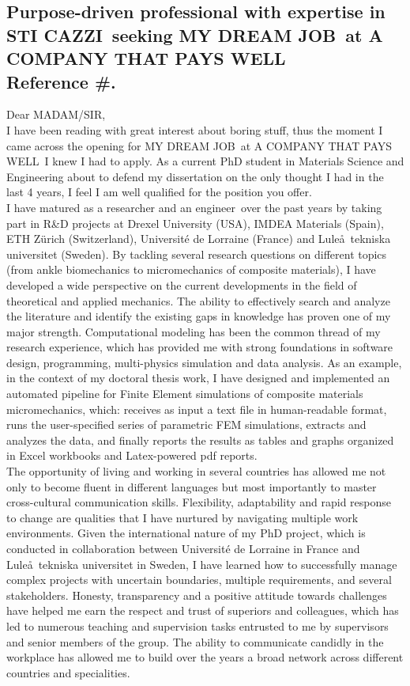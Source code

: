 \documentclass[
  a4paper, 
]{fortysecondscv}
\def\expertise{STI CAZZI}
\def\position{MY DREAM JOB}
\def\company{A COMPANY THAT PAYS WELL}
\def\reference{\\[6pt] Reference \#}
\def\salutation{MADAM/SIR}
\def\readinginterest{boring stuff}
\def\dissertationtopic{the only thought I had in the last 4 years}
\def\profession{a researcher and an engineer}
\def\fieldofexpertise{theoretical and applied mechanics}
\begin{document}
\makefrontsidebar

\cvsignature
\vspace*{12pt}
\subsection{\textbf{Purpose-driven professional with expertise in \expertise\ seeking \position\ at \company\reference.}}
\vspace*{12pt}
Dear \salutation,\\[6pt]
I have been reading with great interest about \readinginterest, thus the moment I came across the opening for \position\ at \company\ I knew I had to apply. As a current PhD student in Materials Science and Engineering about to defend my dissertation on \dissertationtopic, I feel I am well qualified for the position you offer.\\[6pt]
I have matured as \profession\ over the past years by taking part in R\&D projects at Drexel University (USA), IMDEA Materials (Spain), ETH Z\"urich (Switzerland), Universit\'e de Lorraine (France) and Lule\aa\ tekniska universitet (Sweden). By tackling several research questions on different topics (from ankle biomechanics to micromechanics of composite materials), I have developed a wide perspective on the current developments in the field of \fieldofexpertise. The ability to effectively search and analyze the literature and identify the existing gaps in knowledge has proven one of my major strength. Computational modeling has been the common thread of my research experience, which has provided me with strong foundations in software design, programming, multi-physics simulation and data analysis. As an example, in the context of my doctoral thesis work, I have designed and implemented an automated pipeline for Finite Element simulations of composite materials micromechanics, which: receives as input a text file in human-readable format, runs the user-specified series of parametric FEM simulations, extracts and analyzes the data, and finally reports the results as tables and graphs organized in Excel workbooks and Latex-powered pdf reports.\\[6pt]
The opportunity of living and working in several countries has allowed me not only to become fluent in different languages but most importantly to master cross-cultural communication skills. Flexibility, adaptability and rapid response to change are qualities that I have nurtured by navigating multiple work environments. Given the international nature of my PhD project, which is conducted in collaboration between Universit\'e de Lorraine in France and Lule\aa\ tekniska universitet in Sweden, I have learned how to successfully manage complex projects with uncertain boundaries, multiple requirements, and several stakeholders. Honesty, transparency and a positive attitude towards challenges have helped me earn the respect and trust of superiors and colleagues, which has led to numerous teaching and supervision tasks entrusted to me by supervisors and senior members of the group. The ability to communicate candidly in the workplace has allowed me to build over the years a broad network across different countries and specialities.\\[6pt]
\end{document}
